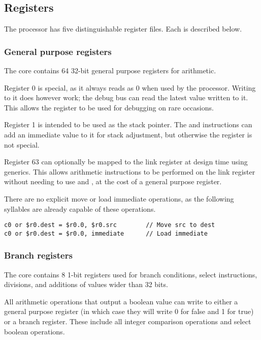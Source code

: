 \subsection{Registers}
\label{sec:core-ug-isa-regs}

The \rvex{} processor has five distinguishable register files. Each is described
below.

\subsubsection{General purpose registers}
\label{sec:core-ug-isa-regs-gp}

The \rvex{} core contains 64 32-bit general purpose registers for arithmetic.

Register 0 is special, as it always reads as 0 when used by the processor.
Writing to it does however work; the debug bus can read the latest value written
to it. This allows the register to be used for debugging on rare occasions.

Register 1 is intended to be used as the stack pointer. The  and
 instructions can add an immediate value to it for stack adjustment,
but otherwise the register is not special.

Register 63 can optionally be mapped to the link register at design time using
generics. This allows arithmetic instructions to be performed on the link
register without needing to use  and , at the cost of a
general purpose register.

There are no explicit move or load immediate operations, as the following
syllables are already capable of these operations.

\begin{lstlisting}[numbers=none, basicstyle=\footnotesize, language=vexasm]
c0 or $r0.dest = $r0.0, $r0.src        // Move src to dest
c0 or $r0.dest = $r0.0, immediate      // Load immediate
\end{lstlisting}

\subsubsection{Branch registers}
\label{sec:core-ug-isa-regs-br}

The \rvex{} core contains 8 1-bit registers used for branch conditions, select
instructions, divisions, and additions of values wider than 32 bits.

All arithmetic operations that output a boolean value can write to either a
general purpose register (in which case they will write 0 for false and 1 for
true) or a branch register. These include all integer comparison operations and
select boolean operations.

